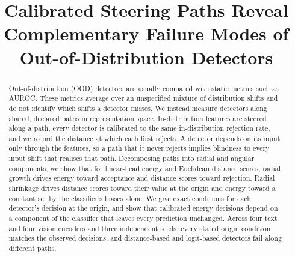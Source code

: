 \documentclass[11pt]{article}
\title{Calibrated Steering Paths Reveal Complementary Failure Modes of Out-of-Distribution Detectors}
\author{\hole{Authors}}
\date{}
\theoremstyle{definition}
\theoremstyle{remark}
\begin{document}
\maketitle

\begin{abstract}
Out-of-distribution (OOD) detectors are usually compared with static metrics such as AUROC. These metrics
average over an unspecified mixture of distribution shifts and do not identify which shifts a detector misses.
We instead measure detectors along shared, declared paths in representation space. In-distribution features
are steered along a path, every detector is calibrated to the same in-distribution rejection rate, and we
record the distance at which each first rejects. A detector depends on its input only through the features,
so a path that it never rejects implies blindness to every input shift that realises that path. Decomposing
paths into radial and angular components, we show that for linear-head energy and Euclidean distance scores,
radial growth drives energy toward acceptance and distance scores toward rejection. Radial shrinkage drives
distance scores toward their value at the origin and energy toward a constant set by the classifier's biases
alone. We give exact conditions for each detector's decision at the origin, and show that calibrated energy
decisions depend on a component of the classifier that leaves every prediction unchanged. Across four text
and four vision encoders and three independent seeds, every stated origin condition matches the observed
decisions, and distance-based and logit-based detectors fail along different paths.
\end{abstract}
\end{document}
